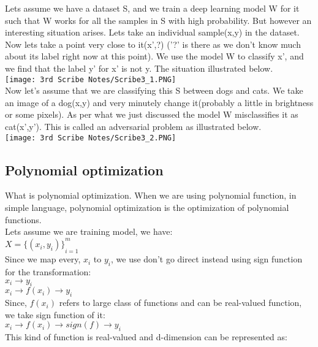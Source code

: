 \documentclass[12pt]{article}
\begin{document}
    Lets assume we have a dataset S, and we train a deep learning model W for it such that W works for all the samples in S with high probability. But however an interesting situation arises. Lets take an individual sample(x,y) in the dataset. Now lets take a point very close to it(x',?) ('?' is there as we don't know much about its label right now at this point). We use the model W to classify x', and we find that the label y' for x' is not y. The situation illustrated below.\\
    \texttt{[image: 3rd Scribe Notes/Scribe3\_1.PNG]}
    \\
    Now let's assume that we are classifying this S between dogs and cats. We take an image of a dog(x,y) and very minutely change it(probably a little in brightness or some pixels). As per what we just discussed the model W misclassifies it as cat(x',y'). This is called an adversarial problem as illustrated below.\\
    \texttt{[image: 3rd Scribe Notes/Scribe3\_2.PNG]}
    \\
    \subsection{Polynomial optimization}
    What is polynomial optimization. When we are using polynomial function, in simple language, polynomial optimization is the optimization of polynomial functions.\\
    Lets assume we are training model, we have:\\
    
    $X = {{\{(x_i,y_i)\}}^m_{i=1}}$\\
    
    Since we map every, $x_i$ to $y_i$, we use don't go direct instead using sign function for the transformation:\\
    
    $x_i \rightarrow y_i $ \\
    
    $x_i \rightarrow f(x_i) \rightarrow y_i$ \\
    
    Since, $f(x_i)$ refers to large class of functions and can be real-valued function, we take sign function of it:\\
    
    $x_i \rightarrow f(x_i) \rightarrow sign(f) \rightarrow y_i$ \\
    
    This kind of function is real-valued and d-dimension can be represented as:\\
    
\end{document}
